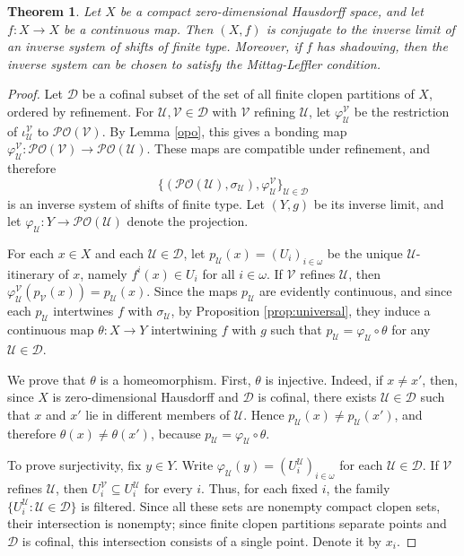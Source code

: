 \documentclass[12pt]{amsart}
\newtheorem{theorem}{Theorem}[section]
\theoremstyle{definition}
\numberwithin{equation}{section}
\theoremstyle{remark}
\begin{document}
\begin{theorem}\label{zerolift}
Let $X$ be a compact zero-dimensional Hausdorff space, and let $f:X\to X$ be a
continuous map. Then $(X,f)$ is conjugate to the inverse limit of an inverse
system of shifts of finite type. Moreover, if $f$ has shadowing, then the
inverse system can be chosen to satisfy the Mittag-Leffler condition.
\end{theorem}

\begin{proof}
Let $\mathcal D$ be a cofinal subset of the set of all finite clopen
partitions of $X$, ordered by refinement. For $\mathcal U,\mathcal V\in\mathcal D$
with $\mathcal V$ refining $\mathcal U$, let
$\varphi_{\mathcal U}^{\mathcal V}$ be the restriction of
$\iota_{\mathcal U}^{\mathcal V}$ to $\mathcal{PO}(\mathcal V)$. By Lemma
\ref{opo}, this gives a bonding map
$\varphi_{\mathcal U}^{\mathcal V}:\mathcal{PO}(\mathcal V)\to
\mathcal{PO}(\mathcal U)$. These maps are compatible under refinement, and
therefore
\[
    \{(\mathcal{PO}(\mathcal U),\sigma_{\mathcal U}),
    \varphi_{\mathcal U}^{\mathcal V}\}_{\mathcal U\in\mathcal D}
\]
is an inverse system of shifts of finite type. Let $(Y,g)$ be its inverse limit,
and let $\varphi_{\mathcal U}:Y\to\mathcal{PO}(\mathcal U)$ denote the 
projection.

For each $x\in X$ and each $\mathcal U\in\mathcal D$, let
$p_{\mathcal U}(x)=(U_i)_{i\in\omega}$ be the unique $\mathcal U$-itinerary of
$x$, namely $f^i(x)\in U_i$ for all $i\in\omega$. If $\mathcal V$ refines
$\mathcal U$, then
$\varphi_{\mathcal U}^{\mathcal V}(p_{\mathcal V}(x))=p_{\mathcal U}(x)$.
Since the maps $p_{\mathcal U}$ are evidently continuous, and since each $p_{\mathcal U}$ intertwines $f$ with
$\sigma_{\mathcal U}$, by Proposition \ref{prop:universal}, they induce a continuous map
$\theta:X\to Y$ intertwining $f$ with $g$ such that $p_{\mathcal U} = \varphi_{\mathcal U}\circ \theta$ for any $\mathcal U\in \mathcal D$.

We prove that $\theta$ is a homeomorphism. First, $\theta$ is injective. Indeed,
if $x\neq x'$, then, since $X$ is zero-dimensional Hausdorff and $\mathcal D$ is
cofinal, there exists $\mathcal U\in\mathcal D$ such that $x$ and $x'$ lie in
different members of $\mathcal U$. Hence $p_{\mathcal U}(x)\neq
p_{\mathcal U}(x')$, and therefore $\theta(x)\neq\theta(x')$, because $p_{\mathcal U} = \varphi_{\mathcal U}\circ \theta$.

To prove surjectivity, fix $y\in Y$. Write
$\varphi_{\mathcal U}(y)=(U_i^{\mathcal U})_{i\in\omega}$ for each
$\mathcal U\in\mathcal D$. If $\mathcal V$ refines $\mathcal U$, then
$U_i^{\mathcal V}\subseteq U_i^{\mathcal U}$ for every $i$. Thus, for each
fixed $i$, the family $\{U_i^{\mathcal U}:\mathcal U\in\mathcal D\}$ is
filtered. Since all these sets are nonempty compact clopen sets, their
intersection is nonempty; since finite clopen partitions separate points and
$\mathcal D$ is cofinal, this intersection consists of a single point. Denote it
by $x_i$.


\end{proof}
\end{document}
